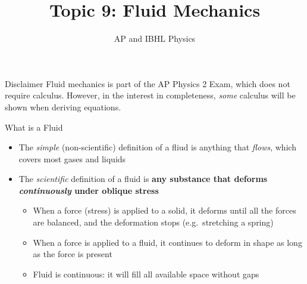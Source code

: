 \documentclass[12pt,aspectratio=169]{beamer}
\title{Topic 9: Fluid Mechanics}
\subtitle{AP and IBHL Physics}
\begin{document}
\begin{frame}
  \maketitle
\end{frame}






\begin{frame}{Disclaimer}
  Fluid mechanics is part of the AP Physics 2 Exam, which does not require
  calculus. However, in the interest in completeness, \emph{some} calculus will
  be shown when deriving equations.
\end{frame}



\begin{frame}{What is a Fluid}
  \begin{itemize}
  \item The \emph{simple} (non-scientific) definition of a fliud is anything
    that \emph{flows}, which covers most gases and liquids
  \item\vspace{.1in}The \emph{scientific} definition of a fluid is \textbf{any
    substance that deforms \emph{continuously} under oblique stress}
    \begin{itemize}
    \item When a force (stress) is applied to a solid, it deforms until all the
      forces are balanced, and the deformation stops (e.g.\ stretching a spring)
    \item When a force is applied to a fluid, it continues to deform in shape as
      long as the force is present
    \item Fluid is continuous: it will fill all available space without gaps
    \end{itemize}
  \end{itemize}
\end{frame}
\end{document}
